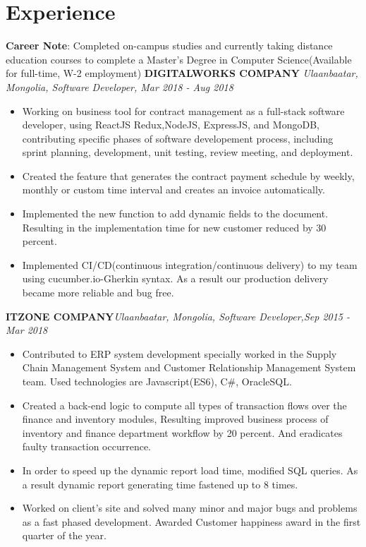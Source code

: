 \documentclass[letterpaper,11pt]{article}
\newcommand{\resumeItemListStart}{\begin{itemize}}
\newcommand{\resumeItemListEnd}{\end{itemize}\vspace{-5pt}}
\begin{document}
\section{Experience}
  \textbf{Career Note}{: Completed on-campus studies and currently taking distance education courses to complete a Master's Degree in Computer Science(Available for full-time, W-2 employment)}
  \vfill
      \textbf{DIGITALWORKS COMPANY} \hfill \textit{Ulaanbaatar, Mongolia, Software Developer, Mar 2018 - Aug 2018}
        \resumeItemListStart
          \item{
            Working on business tool for contract management as a full-stack software developer, using ReactJS Redux,NodeJS, ExpressJS, and MongoDB, contributing specific phases of software developement process, including sprint planning, development, unit testing, review meeting, and deployment.
          }
          \item{
            Created the feature that generates the contract payment schedule by weekly, monthly or custom time interval and creates an invoice automatically.
          }
          \item{
            Implemented the new function to add dynamic fields to the document. Resulting in the implementation time for new customer reduced by 30 percent.
          }
          \item{
            Implemented CI/CD(continuous integration/continuous delivery) to my team using cucumber.io-Gherkin syntax.
            As a result our production delivery became more reliable and bug free.
          }
        \resumeItemListEnd
  
      \textbf{ITZONE COMPANY}\hfill \textit{Ulaanbaatar, Mongolia, Software Developer,Sep 2015 - Mar 2018}
      \resumeItemListStart
        \item{
          Contributed to ERP system development specially worked in the Supply Chain Management System and Customer Relationship Management System team. Used technologies are Javascript(ES6), C\#, OracleSQL.
        }
        \item{
          Created a back-end logic to compute all types of transaction flows over the finance and inventory modules, Resulting improved business process of inventory and finance department workflow by 20 percent. And eradicates faulty transaction occurrence.
        }
        \item{
          In order to speed up the dynamic report load time, modified SQL queries. As a result dynamic report generating time fastened up to 8 times.
        }
        \item{
          Worked on client's site and solved many minor and major bugs and problems as a fast phased development. Awarded Customer happiness award in the first quarter of the year.
        }
      \resumeItemListEnd
  
\end{document}
